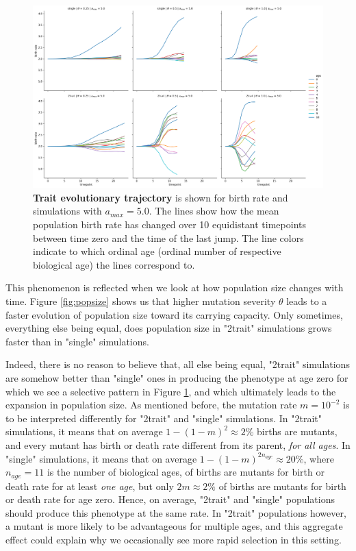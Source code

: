 \documentclass[11pt, a4paper]{article}
\theoremstyle{definition}
\begin{document}
    \begin{figure}[!htb]
        \center
        \includegraphics[width=\textwidth]{figures/trait_evo2.png}
        \caption{\textbf{Trait evolutionary trajectory} is shown for birth rate and simulations with $a_{max}=5.0$. The lines show how the mean population birth rate has changed over 10 equidistant timepoints between time zero and the time of the last jump. The line colors indicate to which ordinal age (ordinal number of respective biological age) the lines correspond to.}
        \label{fig:traits}
    \end{figure}

    This phenomenon is reflected when we look at how population size changes with time. Figure \ref{fig:popsize} shows us that higher mutation severity $\theta$ leads to a faster evolution of population size toward its carrying capacity. Only sometimes, everything else being equal, does population size in "2trait" simulations grows faster than in "single" simulations.

    Indeed, there is no reason to believe that, all else being equal, "2trait" simulations are somehow better than "single" ones in producing the phenotype at age zero for which we see a selective pattern in Figure \ref{fig:traits}, and which ultimately leads to the expansion in population size. As mentioned before, the mutation rate $m=10^{-2}$ is to be interpreted differently for "2trait" and "single" simulations. In "2trait" simulations, it means that on average $1-(1-m)^2 \approx 2\%$ births are mutants, and every
    mutant has birth or death rate different from its parent, \emph{for all ages}. In "single" simulations, it means that on average $1 - (1-m)^{2n_{age}} \approx 20\%$, where $n_{age} = 11$ is the number of biological ages, of
    births are mutants for birth or death rate for at least \emph{one age}, but only $2m \approx 2\%$ of  births are mutants for birth or death rate for age zero. Hence, on average, "2trait" and "single" populations should produce this phenotype at the same rate. In "2trait" populations however, a mutant is more likely to be advantageous for multiple ages, and this aggregate effect could explain why we occasionally see more rapid selection in this setting.
\end{document}
